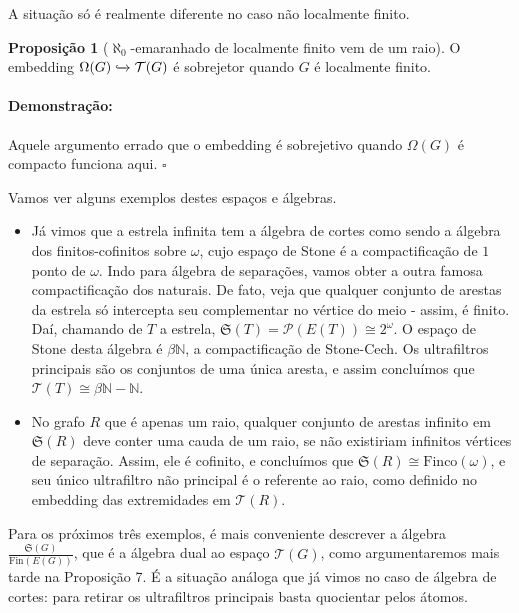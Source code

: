 \documentclass[11pt]{article}
\newcommand{\pulinho}{\vspace{.5cm}}
\theoremstyle{definition}
\theoremstyle{definition}
\theoremstyle{definition}
\newtheorem{prop}{Proposição}
\newenvironment{proposicao}{
\definecolor{shadecolor}{HTML}{FFDBDF}
\begin{shaded}
\begin{prop}
}
{
\end{prop}
\end{shaded}
}
\theoremstyle{definition}
\theoremstyle{definition}
\theoremstyle{definition}
\theoremstyle{definition}
\theoremstyle{definition}
\theoremstyle{definition}
\theoremstyle{definition}
\newtheorem*{example*}{Exemplo}
\newenvironment{exemplo*}{
\definecolor{shadecolor}{HTML}{b9e6d3}
\begin{shaded}
\begin{example*}
}
{
\end{example*}
\end{shaded}
}
\theoremstyle{definition}
\theoremstyle{definition}
\newenvironment{prova}{\paragraph{Demonstração:}}{\hfill$\square$ 
\pulinho
}
\begin{document}
A situação só é realmente diferente no caso não localmente finito.

\begin{proposicao}[$\aleph_0$-emaranhado de localmente finito vem de um raio]
    O embedding $\Omega(G)\xhookrightarrow{} \mathcal{T}(G)$ é sobrejetor quando $G$ é localmente finito.
\end{proposicao}
\begin{prova}
    Aquele argumento errado que o embedding é sobrejetivo quando $\Omega(G)$ é compacto funciona aqui.
\end{prova}


Vamos ver alguns exemplos destes espaços e álgebras.

\begin{exemplo*}
    \begin{itemize}[]
        \item Já vimos que a estrela infinita tem a álgebra de cortes como sendo a álgebra dos finitos-cofinitos sobre $\omega$, cujo espaço de Stone é a compactificação de $1$ ponto de $\omega$. Indo para álgebra de separações, vamos obter a outra famosa compactificação dos naturais. De fato, veja que qualquer conjunto de arestas da estrela só intercepta seu complementar no vértice do meio - assim, é finito. Daí, chamando de $T$ a estrela, $\mathfrak{S}(T) = \mathcal{P}(E(T)) \cong 2^\omega$. O espaço de Stone desta álgebra é $\beta\mathbb{N}$, a compactificação de Stone-Cech. Os ultrafiltros principais são os conjuntos de uma única aresta, e assim concluímos que $\mathcal{T}(T) \cong \beta\mathbb{N} - \mathbb{N}$.
        \item No grafo $R$ que é apenas um raio, qualquer conjunto de arestas infinito em $\mathfrak{S}(R) $ deve conter uma cauda de um raio, se não existiriam infinitos vértices de separação. Assim, ele é cofinito, e concluímos que $\mathfrak{S}(R) \cong \text{Finco}(\omega) $, e seu único ultrafiltro não principal é o referente ao raio, como definido no embedding das extremidades em $\mathcal{T}(R)$.
    \end{itemize}

    \pulinho
    

    Para os próximos três exemplos, é mais conveniente descrever a álgebra $\frac{\mathfrak{S}(G)}{\text{Fin}(E(G))}$, que é a álgebra dual ao espaço $\mathcal{T}(G)$, como argumentaremos mais tarde na Proposição 7. É a situação análoga que já vimos no caso de álgebra de cortes: para retirar os ultrafiltros  principais basta quocientar pelos átomos.


\end{exemplo*}
\end{document}
